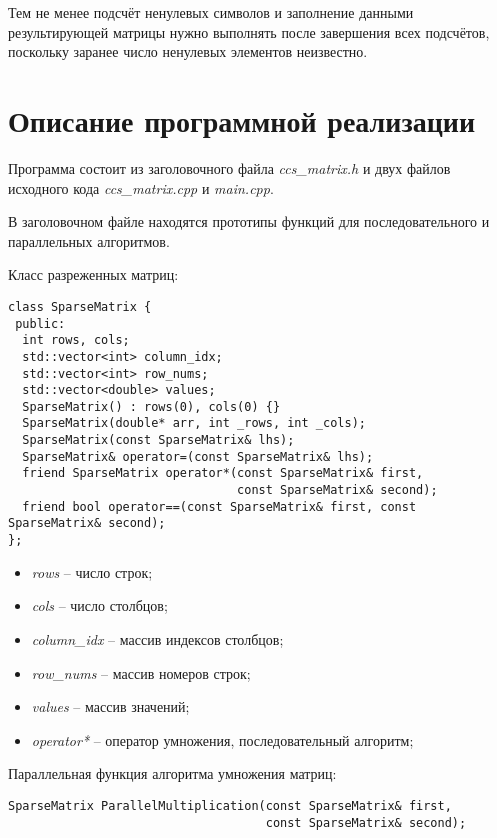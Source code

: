 \documentclass{report}
\begin{document}
    \par Тем не менее подсчёт ненулевых символов и заполнение данными результирующей матрицы нужно выполнять после завершения всех подсчётов, поскольку заранее число ненулевых элементов неизвестно.
\newpage

\section*{Описание программной реализации}
Программа состоит из заголовочного файла \emph{ccs\_matrix.h} и двух файлов исходного кода \emph{ccs\_matrix.cpp} и \emph{main.cpp}.
\par В заголовочном файле находятся прототипы функций для последовательного и параллельных алгоритмов.

\par Класс разреженных матриц:
\begin{lstlisting}
class SparseMatrix {
 public:
  int rows, cols;
  std::vector<int> column_idx;
  std::vector<int> row_nums;
  std::vector<double> values;
  SparseMatrix() : rows(0), cols(0) {}
  SparseMatrix(double* arr, int _rows, int _cols);
  SparseMatrix(const SparseMatrix& lhs);
  SparseMatrix& operator=(const SparseMatrix& lhs);
  friend SparseMatrix operator*(const SparseMatrix& first,
                                const SparseMatrix& second);
  friend bool operator==(const SparseMatrix& first, const SparseMatrix& second);
};
\end{lstlisting}

\begin{itemize}
    \item \textit{rows} -- число строк;
    \item \textit{cols} -- число столбцов;
    \item \textit{column\_idx} -- массив индексов столбцов;
    \item \textit{row\_nums} -- массив номеров строк;
    \item \textit{values} -- массив значений;
    \item \textit{operator*} -- оператор умножения, последовательный алгоритм;
\end{itemize}

\par Параллельная функция алгоритма умножения матриц:
\begin{lstlisting}
SparseMatrix ParallelMultiplication(const SparseMatrix& first,
                                    const SparseMatrix& second);
\end{lstlisting}
\end{document}
